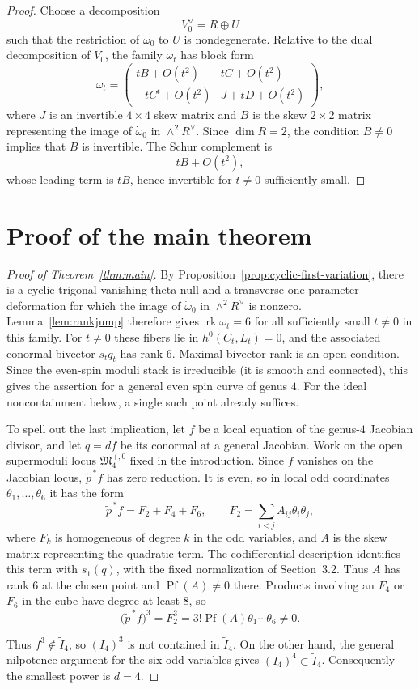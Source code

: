 \documentclass[10pt,a4paper]{amsart}
\newcommand{\FM}{\mathfrak M}
\begin{document}
\begin{proof}
Choose a decomposition
\[
V_0^\vee = R\oplus U
\]
such that the restriction of \(\omega_0\) to \(U\) is nondegenerate. Relative to the dual decomposition of \(V_0\), the family \(\omega_t\) has block form
\[
\omega_t=
\begin{pmatrix}
tB+O(t^2) & tC+O(t^2)\\
-tC^t+O(t^2) & J+tD+O(t^2)
\end{pmatrix},
\]
where \(J\) is an invertible \(4\times4\) skew matrix and \(B\) is the skew \(2\times2\) matrix representing the image of \(\dot\omega_0\) in \(\wedge^2 R^\vee\). Since \(\dim R=2\), the condition \(B\neq 0\) implies that \(B\) is invertible. The Schur complement is
\[
{tB+O(t^2),}
\]
whose leading term is \(tB\), hence invertible for \(t\neq 0\) sufficiently small.
\end{proof}

\section{Proof of the main theorem}


\begin{proof}[Proof of Theorem~\ref{thm:main}]
By Proposition~\ref{prop:cyclic-first-variation}, there is a cyclic
trigonal vanishing theta-null and a transverse one-parameter deformation
for which the image of $\dot\omega_0$ in $\wedge^2R^\vee$ is nonzero.
Lemma~\ref{lem:rankjump} therefore gives
$\operatorname{rk}\omega_t=6$ for all sufficiently small $t\neq0$ in
this family.
{For $t\neq0$ these fibers lie in $h^0(C_t,L_t)=0$, and the
associated conormal bivector $s_tq_t$ has rank $6$. Maximal bivector
rank is an open condition. Since the even-spin moduli stack is
irreducible (it is smooth and connected), this gives the assertion for
a general even spin curve of genus $4$. For the ideal noncontainment
below, a single such point already suffices.}

To spell out the last implication, let $f$ be a local equation of the
genus-$4$ Jacobian divisor, and let $q=df$ be its conormal at a general
Jacobian.
{Work on the open supermoduli locus $\FM_4^{+,0}$ fixed in the introduction.}
\begingroup
Since $f$ vanishes on the Jacobian locus, $\widetilde p^{\,*}f$ has
zero reduction. It is even, so in local odd coordinates
$\theta_1,\ldots,\theta_6$ it has the form
\[
\widetilde p^{\,*}f=F_2+F_4+F_6,\qquad
F_2=\sum_{i<j}A_{ij}\theta_i\theta_j,
\]
where $F_k$ is homogeneous of degree $k$ in the odd variables, and $A$ is the skew matrix
representing the quadratic term. The codifferential description
identifies this term with $s_1(q)$, with the fixed normalization of
Section~3.2. Thus $A$ has rank $6$ at the chosen point and
$\operatorname{Pf}(A)\neq0$ there. Products involving an $F_4$ or
$F_6$ in the cube have degree at least $8$, so
\[
\bigl(\widetilde p^{\,*}f\bigr)^3
=F_2^3=3!\operatorname{Pf}(A)\theta_1\cdots\theta_6\neq0.
\]
\endgroup

Thus $f^3\notin\widetilde I_4$, so $(I_4)^3$ is not contained in
$\widetilde I_4$.  On the other hand, the general nilpotence argument
for the six odd variables gives $(I_4)^4\subset\widetilde I_4$.
Consequently the smallest power is $d=4$.
\end{proof}
\end{document}
